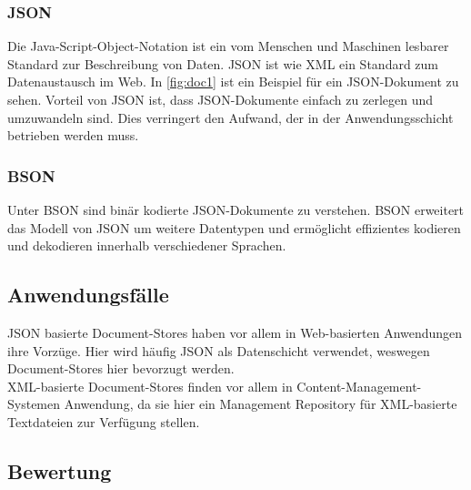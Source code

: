 \subsubsection{JSON}
Die Java-Script-Object-Notation ist ein vom Menschen und Maschinen lesbarer Standard zur Beschreibung von Daten. JSON ist wie XML ein Standard zum Datenaustausch im Web.
In \ref{fig:doc1} ist ein Beispiel für ein JSON-Dokument zu sehen. Vorteil von JSON ist, dass JSON-Dokumente einfach zu zerlegen und umzuwandeln sind. Dies verringert den Aufwand, der in der Anwendungsschicht betrieben werden muss.
\subsubsection{BSON}
Unter BSON sind binär kodierte JSON-Dokumente zu verstehen. BSON erweitert das Modell von JSON um weitere Datentypen und ermöglicht effizientes kodieren und dekodieren innerhalb verschiedener Sprachen.
\subsection{Anwendungsfälle}
JSON basierte Document-Stores haben vor allem in Web-basierten Anwendungen ihre Vorzüge. Hier wird häufig JSON als Datenschicht verwendet, weswegen Document-Stores hier bevorzugt werden.
\\

XML-basierte Document-Stores finden vor allem in Content-Management-Systemen Anwendung, da sie hier ein Management Repository für XML-basierte Textdateien zur Verfügung stellen.
\subsection{Bewertung}

